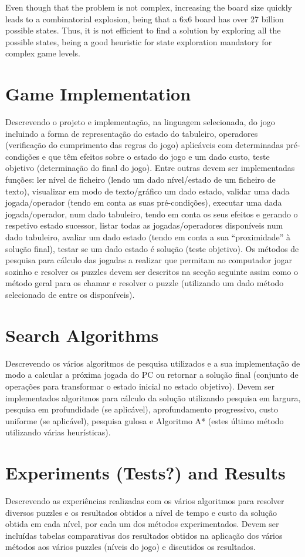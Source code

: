 \documentclass[conference]{IEEEtran}
\begin{document}
Even though that the problem is not complex, increasing the board size quickly leads to a combinatorial explosion, being that a 6x6 board has over 27 billion possible states. Thus, it is not efficient to find a solution by exploring all the possible states, being a good heuristic for state exploration mandatory for complex game levels.

\section{Game Implementation}
Descrevendo o projeto e implementação, na linguagem selecionada, do jogo incluindo a forma de representação do estado do tabuleiro, operadores (verificação do cumprimento das regras do jogo) aplicáveis com determinadas pré-condições e que têm efeitos sobre o estado do jogo e um dado custo, teste objetivo (determinação do final do jogo). Entre outras devem ser implementadas funções: ler nível de ficheiro (lendo um dado nível/estado de um ficheiro de texto), visualizar em modo de texto/gráfico um dado estado, validar uma dada jogada/operador (tendo em conta as suas pré-condições), executar uma dada jogada/operador, num dado tabuleiro, tendo em conta os seus efeitos e gerando o respetivo estado sucessor, listar todas as jogadas/operadores disponíveis num dado tabuleiro, avaliar um dado estado (tendo em conta a sua “proximidade” à solução final), testar se um dado estado é solução (teste objetivo). Os métodos de pesquisa para cálculo das jogadas a realizar que permitam ao computador jogar sozinho e resolver os puzzles devem ser descritos na secção seguinte assim como o método geral para os chamar e resolver o puzzle (utilizando um dado método selecionado de entre os disponíveis).

\section{Search Algorithms}
Descrevendo os vários algoritmos de pesquisa utilizados e a sua implementação de modo a calcular a próxima jogada do PC ou retornar a solução final (conjunto de operações para transformar o estado inicial no estado objetivo). Devem ser implementados algoritmos para cálculo da solução utilizando pesquisa em largura, pesquisa em profundidade (se aplicável), aprofundamento progressivo, custo uniforme (se aplicável), pesquisa gulosa e Algoritmo A* (estes último método utilizando várias heurísticas).

\section{Experiments (Tests?) and Results}
Descrevendo as experiências realizadas com os vários algoritmos para resolver diversos puzzles e os resultados obtidos a nível de tempo e custo da solução obtida em cada nível, por cada um dos métodos experimentados. Devem ser incluídas tabelas comparativas dos resultados obtidos na aplicação dos vários métodos aos vários puzzles (níveis do jogo) e discutidos os resultados.
\end{document}
